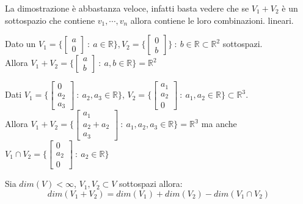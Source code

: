 \begin{demostration}
La dimostrazione è abbastanza veloce, infatti basta vedere che se $V_1 + V_2$ è un sottospazio che contiene $v_1, \cdots, v_n$ allora contiene le loro combinazioni. lineari.
\end{demostration}

\begin{example}
Dato un $V_1 = \{\begin{bmatrix}a\\0\end{bmatrix}\::\: a \in \mathbb{R}\}, V_2 = \{\begin{bmatrix}0\\b\end{bmatrix}\} \::\: b \in \mathbb{R} \subset \mathbb{R}^2$ sottospazi.\\
Allora $V_1 + V_2 = \{\begin{bmatrix}a\\b\end{bmatrix}\::\: a,b \in \mathbb{R}\} = \mathbb{R}^2$
\end{example}

\begin{example}
Dati $V_1 = \{\begin{bmatrix}0\\a_2\\a_3\end{bmatrix}\::\: a_2, a_3 \in \mathbb{R}\}$, $V_2 = \{\begin{bmatrix}a_1\\a_2\\0\end{bmatrix}\::\: a_1, a_2 \in \mathbb{R}\} \subset \mathbb{R}^3$.\\
Allora $V_1 + V_2 = \{\begin{bmatrix}a_1\\a_2 + a_2\\a_3\end{bmatrix} \::\: a_1, a_2, a_3 \in \mathbb{R}\} = \mathbb{R^3}$ ma anche $V_1 \cap V_2 = \{\begin{bmatrix}0\\a_2\\0\end{bmatrix} \::\: a_2 \in \mathbb{R}\}$
\end{example}

\begin{theorem}
Sia $dim(V) < \infty$, $V_1, V_2 \subset V$ sottospazi allora:
\[dim(V_1 + V_2) = dim(V_1) + dim(V_2) - dim(V_1 \cap V_2)\]
\end{theorem}

